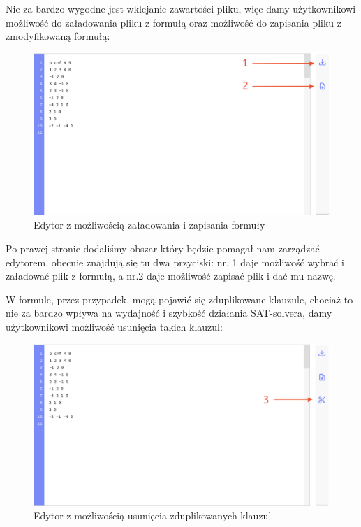 \documentclass[a4paper,12pt,oneside]{book}
\theoremstyle{definition}
\begin{document}
Nie za bardzo wygodne jest wklejanie zawartości pliku, więc damy użytkownikowi możliwość do załadowania pliku z formułą oraz możliwość do zapisania pliku z zmodyfikowaną formułą:

\newpage

\begin{figure}[ht]
    \centering
    \includegraphics[width=14.30cm]{2}
    \caption{Edytor z możliwością załadowania i zapisania formuły}
    \label{fig:2}
\end{figure}

\noindent Po prawej stronie dodaliśmy obszar który będzie pomagał nam zarządzać edytorem, obecnie znajdują się tu dwa przyciski: nr. 1 daje możliwość wybrać i załadować plik z formułą, a nr.2 daje możliwość zapisać plik i dać mu nazwę.

W formule, przez przypadek, mogą pojawić się zduplikowane klauzule, chociaż to nie za bardzo wpływa na wydajność i szybkość działania SAT-solvera, damy użytkownikowi możliwość usunięcia takich klauzul:

\begin{figure}[ht]
    \centering
    \includegraphics[width=14.30cm]{3}
    \caption{Edytor z możliwością usunięcia zduplikowanych klauzul}
    \label{fig:3}
\end{figure}
\end{document}
